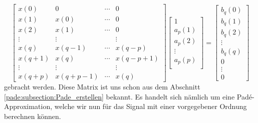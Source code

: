 \begin{equation}
\left[\begin{array}{cccc}
x(0) & 0 & \cdots & 0 \\
x(1) & x(0) & \cdots & 0 \\
x(2) & x(1) & \cdots & 0 \\
\vdots & \vdots & & \vdots \\
x(q) & x(q-1) & \cdots & x(q-p) \\
x(q+1) & x(q) & \cdots & x(q-p+1) \\
\vdots & \vdots & & \vdots \\
x(q+p) & x(q+p-1) & \cdots & x(q)
\end{array}\right]
\left[\begin{array}{c}
1 \\
a_{p}(1) \\
a_{p}(2) \\
\vdots \\
a_{p}(p) \\
\end{array}\right]
=
\left[\begin{array}{c}
b_{q}(0) \\
b_{q}(1) \\
b_{q}(2) \\
\vdots \\
b_{q}(q) \\
0 \\
\vdots \\
0
\end{array}\right]
\end{equation}
gebracht werden.
Diese Matrix ist uns schon aus dem Abschnitt \ref{pade:subsection:Pade_erstellen} bekannt. Es handelt sich nämlich um eine Padé-Approximation,
welche wir nun für das Signal mit einer vorgegebener Ordnung berechnen können.

